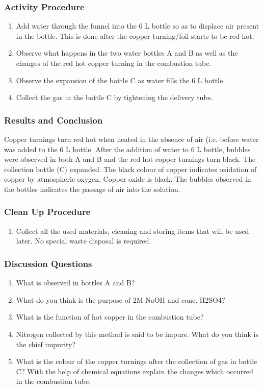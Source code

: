 \subsubsection*{Activity Procedure}
\begin{enumerate}
\item{Add water through the funnel into the 6 L bottle so as to displace air present in the bottle. This is done after the copper turning/foil starts to be red hot.}
\item{Observe what happens in the two water bottles A and B as well as the changes of the red hot copper turning in the combustion tube.}
\item{Observe the expansion of the bottle C as water fills the 6 L bottle.}
\item{Collect the gas in the bottle C by tightening the delivery tube.}
\end{enumerate}

\subsubsection*{Results and Conclusion}
Copper turnings turn red hot when heated in the absence of air (i.e. before water was added to the 6 L bottle. After the addition of water to 6 L bottle, bubbles were observed in both A and B and the red hot copper turnings turn black. The collection bottle (C) expanded. The black colour of copper indicates oxidation of copper by atmospheric oxygen. Copper oxide is black. The bubbles observed in the bottles indicates the passage of air into the solution.

\subsubsection*{Clean Up Procedure}
\begin{enumerate}
\item{Collect all the used materials, cleaning and storing items that will be used later. No special waste disposal is required.}
\end{enumerate}

\subsubsection*{Discussion Questions}
\begin{enumerate}
\item{What is observed in bottles A and B?}
\item{What do you think is the purpose of 2M NaOH and conc. H2SO4?}
\item{What is the function of hot copper in the combustion tube?}
\item{Nitrogen collected by this method is said to be impure. What do you think is the chief impurity?}
\item{What is the colour of the copper turnings after the collection of gas in bottle C? With the help of chemical equations explain the changes which occurred in the combustion tube.}
\end{enumerate}

